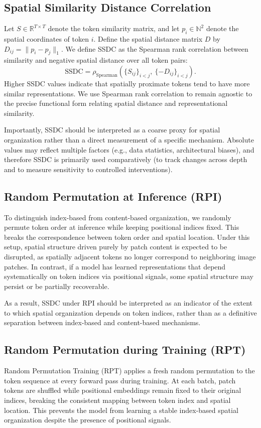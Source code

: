 \documentclass{article}
\begin{document}
\subsection{Spatial Similarity Distance Correlation}
Let $S \in \mathbb{R}^{T \times T}$ denote the token similarity matrix, and let $p_i \in \mathbb{N}^2$ denote the spatial coordinates of token $i$. Define the spatial distance matrix $D$ by $D_{ij} = \|p_i - p_j\|_1$. We define SSDC as the Spearman rank correlation between similarity and negative spatial distance over all token pairs:
\[
\mathrm{SSDC} = \rho_{\mathrm{Spearman}}\left(\{S_{ij}\}_{i < j},\ \{-D_{ij}\}_{i < j}\right).
\]
Higher SSDC values indicate that spatially proximate tokens tend to have more similar representations. We use Spearman rank correlation to remain agnostic to the precise functional form relating spatial distance and representational similarity.

Importantly, SSDC should be interpreted as a coarse proxy for spatial organization rather than a direct measurement of a specific mechanism. Absolute values may reflect multiple factors (e.g., data statistics, architectural biases), and therefore SSDC is primarily used comparatively (to track changes across depth and to measure sensitivity to controlled interventions).
\subsection{Random Permutation at Inference (RPI)}
To distinguish index-based from content-based organization, we randomly permute token order at inference while keeping positional indices fixed. This breaks the correspondence between token order and spatial location. Under this setup, spatial structure driven purely by patch content is expected to be disrupted, as spatially adjacent tokens no longer correspond to neighboring image patches. In contrast, if a model has learned representations that depend systematically on token indices via positional signals, some spatial structure may persist or be partially recoverable.

As a result, SSDC under RPI should be interpreted as an indicator of the extent to which spatial organization depends on token indices, rather than as a definitive separation between index-based and content-based mechanisms.
\subsection{Random Permutation during Training (RPT)}
Random Permutation Training (RPT) applies a fresh random permutation to the token sequence at every forward pass during training. At each batch, patch tokens are shuffled while positional embeddings remain fixed to their original indices, breaking the consistent mapping between token index and spatial location. This prevents the model from learning a stable index-based spatial organization despite the presence of positional signals.
\end{document}
